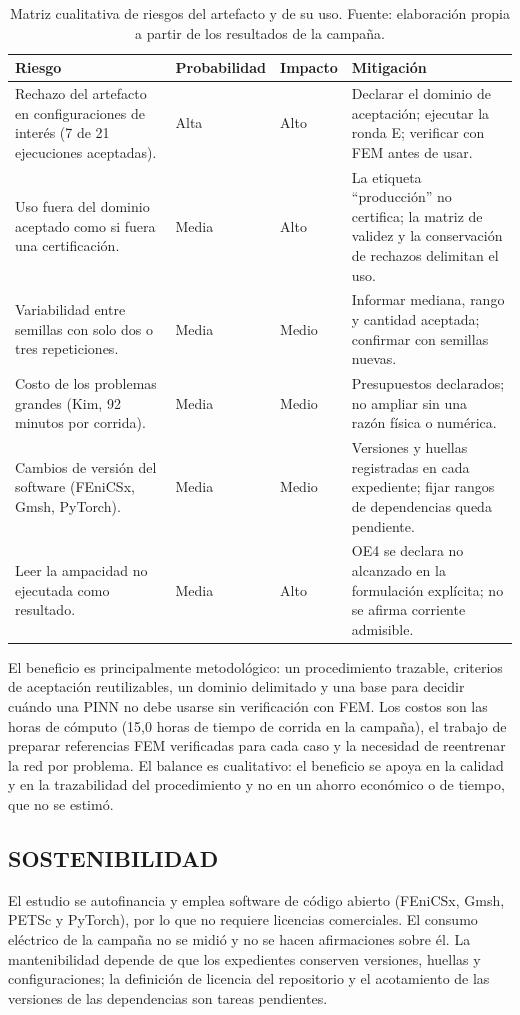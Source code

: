 \begin{table}[htbp]
\centering
\caption{Matriz cualitativa de riesgos del artefacto y de su uso. Fuente: elaboración propia a partir de los resultados de la campaña.}
\label{tab:matriz-riesgos}
\begin{tabularx}{\textwidth}{L{3.6cm}C{1.8cm}C{1.5cm}Y}
\toprule
Riesgo & Probabilidad & Impacto & Mitigación \\
\midrule
Rechazo del artefacto en configuraciones de interés (7 de 21 ejecuciones aceptadas). & Alta & Alto & Declarar el dominio de aceptación; ejecutar la ronda E; verificar con FEM antes de usar. \\
Uso fuera del dominio aceptado como si fuera una certificación. & Media & Alto & La etiqueta ``producción'' no certifica; la matriz de validez y la conservación de rechazos delimitan el uso. \\
Variabilidad entre semillas con solo dos o tres repeticiones. & Media & Medio & Informar mediana, rango y cantidad aceptada; confirmar con semillas nuevas. \\
Costo de los problemas grandes (Kim, 92 minutos por corrida). & Media & Medio & Presupuestos declarados; no ampliar sin una razón física o numérica. \\
Cambios de versión del software (FEniCSx, Gmsh, PyTorch). & Media & Medio & Versiones y huellas registradas en cada expediente; fijar rangos de dependencias queda pendiente. \\
Leer la ampacidad no ejecutada como resultado. & Media & Alto & OE4 se declara no alcanzado en la formulación explícita; no se afirma corriente admisible. \\
\bottomrule
\end{tabularx}
\end{table}

El beneficio es principalmente metodológico: un procedimiento trazable, criterios de aceptación reutilizables, un dominio delimitado y una base para decidir cuándo una PINN no debe usarse sin verificación con FEM. Los costos son las horas de cómputo (15,0 horas de tiempo de corrida en la campaña), el trabajo de preparar referencias FEM verificadas para cada caso y la necesidad de reentrenar la red por problema. El balance es cualitativo: el beneficio se apoya en la calidad y en la trazabilidad del procedimiento y no en un ahorro económico o de tiempo, que no se estimó.

\subsection{SOSTENIBILIDAD}

El estudio se autofinancia y emplea software de código abierto (FEniCSx, Gmsh, PETSc y PyTorch), por lo que no requiere licencias comerciales. El consumo eléctrico de la campaña no se midió y no se hacen afirmaciones sobre él. La mantenibilidad depende de que los expedientes conserven versiones, huellas y configuraciones; la definición de licencia del repositorio y el acotamiento de las versiones de las dependencias son tareas pendientes.
